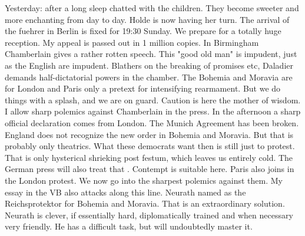 Yesterday: after a long sleep chatted with the children. They become sweeter and more enchanting from day to day.  Holde is now having her turn. The arrival of the fuehrer in Berlin is fixed for 19:30 Sunday. We prepare for a totally huge reception. My appeal is passed out in 1 million copies. In Birmingham Chamberlain gives a rather rotten speech. This "good old man" is impudent, just as the English are impudent. Blathers on the breaking of promises etc, Daladier demands half-dictatorial powers in the chamber. The Bohemia and Moravia are for London and Paris only a pretext for intensifying rearmament. But we do things with a splash, and we are on guard. Caution is here the mother of wisdom. I allow sharp polemics against Chamberlain in the press. In the afternoon a sharp official declaration comes from London. The Munich Agreement has been broken. England does not recognize the new order in Bohemia and Moravia. But that is probably only theatrics. What these democrats want then is still just to protest. That is only hysterical shrieking post festum, which leaves us entirely cold. The German press will also treat that . Contempt is suitable here. Paris also joins in the London protest. We now go into the sharpest polemics against them. My essay in the VB also attacks along this line. Neurath named as the Reichsprotektor for Bohemia and Moravia. That is an extraordinary solution. Neurath is clever, if essentially hard, diplomatically trained and when necessary very friendly. He has a difficult task, but will undoubtedly master it.